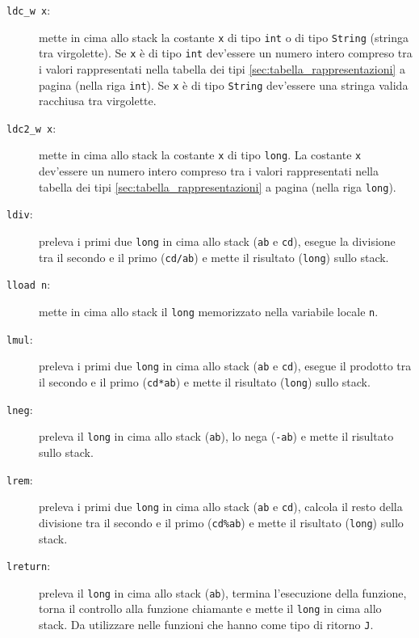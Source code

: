 \begin{description}
  \item[\texttt{ldc\_w x}:] mette in cima allo stack la costante \texttt{x} di tipo \texttt{int} o di tipo \texttt{String} (stringa tra virgolette). Se \texttt{x} \`e di tipo \texttt{int} dev'essere un numero intero compreso tra i valori rappresentati nella tabella dei tipi \ref{sec:tabella_rappresentazioni} a pagina \pageref{sec:tabella_rappresentazioni} (nella riga \texttt{int}). Se \texttt{x} \`e di tipo \texttt{String} dev'essere una stringa valida racchiusa tra virgolette.

  \item[\texttt{ldc2\_w x}:] mette in cima allo stack la costante \texttt{x} di tipo \texttt{long}. La costante \texttt{x} dev'essere un numero intero compreso tra i valori rappresentati nella tabella dei tipi \ref{sec:tabella_rappresentazioni} a pagina \pageref{sec:tabella_rappresentazioni} (nella riga \texttt{long}).

  \item[\texttt{ldiv}:] preleva i primi due \texttt{long} in cima allo stack (\texttt{ab} e \texttt{cd}), esegue la divisione tra il secondo e il primo (\texttt{cd/ab}) e mette il risultato (\texttt{long}) sullo stack.

  \item[\texttt{lload n}:] mette in cima allo stack il \texttt{long} memorizzato nella variabile locale \texttt{n}.

  \item[\texttt{lmul}:] preleva i primi due \texttt{long} in cima allo stack (\texttt{ab} e \texttt{cd}), esegue il prodotto tra il secondo e il primo (\texttt{cd*ab}) e mette il risultato (\texttt{long}) sullo stack.

  \item[\texttt{lneg}:] preleva il \texttt{long} in cima allo stack (\texttt{ab}), lo nega (\texttt{-ab}) e mette il risultato sullo stack.

  \item[\texttt{lrem}:] preleva i primi due \texttt{long} in cima allo stack (\texttt{ab} e \texttt{cd}), calcola il resto della divisione tra il secondo e il primo (\texttt{cd\%ab}) e mette il risultato (\texttt{long}) sullo stack.

  \item[\texttt{lreturn}:] preleva il \texttt{long} in cima allo stack (\texttt{ab}), termina l'esecuzione della funzione, torna il controllo alla funzione chiamante e mette il \texttt{long} in cima allo stack. Da utilizzare nelle funzioni che hanno come tipo di ritorno \texttt{J}.


\end{description}
